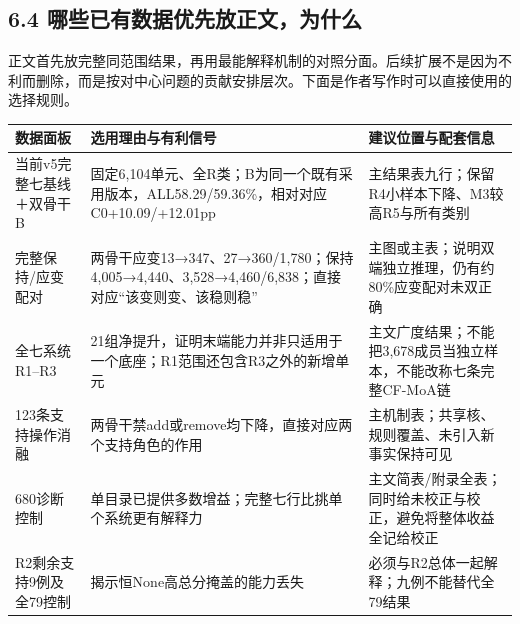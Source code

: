 \documentclass[
  11pt,
  a4paper,
]{article}
\newcounter{none} %
\begin{document}
\subsection{6.4
哪些已有数据优先放正文，为什么}\label{ux54eaux4e9bux5df2ux6709ux6570ux636eux4f18ux5148ux653eux6b63ux6587ux4e3aux4ec0ux4e48}

正文首先放完整同范围结果，再用最能解释机制的对照分面。后续扩展不是因为不利而删除，而是按对中心问题的贡献安排层次。下面是作者写作时可以直接使用的选择规则。

{\def\LTcaptype{none} %
\begin{longtable}[]{@{}
  >{\raggedright\arraybackslash}p{}
  >{\raggedright\arraybackslash}p{}
  >{\raggedright\arraybackslash}p{}@{}}
\toprule\noalign{}
\begin{minipage}[b]{\linewidth}\raggedright
数据面板
\end{minipage} & \begin{minipage}[b]{\linewidth}\raggedright
选用理由与有利信号
\end{minipage} & \begin{minipage}[b]{\linewidth}\raggedright
建议位置与配套信息
\end{minipage} \\
\midrule\noalign{}
\endhead
\bottomrule\noalign{}
\endlastfoot
当前v5完整七基线＋双骨干B &
固定6,104单元、全R类；B为同一个既有采用版本，ALL58.29/59.36\%，相对对应C0+10.09/+12.01pp
& 主结果表九行；保留R4小样本下降、M3较高R5与所有类别 \\
完整保持/应变配对 &
两骨干应变13→347、27→360/1,780；保持4,005→4,440、3,528→4,460/6,838；直接对应``该变则变、该稳则稳''
& 主图或主表；说明双端独立推理，仍有约80\%应变配对未双正确 \\
全七系统R1--R3 &
21组净提升，证明末端能力并非只适用于一个底座；R1范围还包含R3之外的新增单元
& 主文广度结果；不能把3,678成员当独立样本，不能改称七条完整CF-MoA链 \\
123条支持操作消融 &
两骨干禁add或remove均下降，直接对应两个支持角色的作用 &
主机制表；共享核、规则覆盖、未引入新事实保持可见 \\
680诊断控制 & 单目录已提供多数增益；完整七行比挑单个系统更有解释力 &
主文简表/附录全表；同时给未校正与校正，避免将整体收益全记给校正 \\
R2剩余支持9例及全79控制 & 揭示恒None高总分掩盖的能力丢失 &
必须与R2总体一起解释；九例不能替代全79结果 \\

\end{longtable}}
\end{document}
